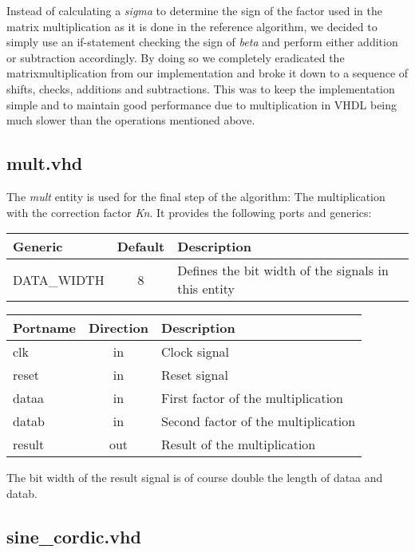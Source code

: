 Instead of calculating a \textit{sigma} to determine the sign of the factor used in the matrix multiplication as it is done in the reference algorithm, we decided to simply use an if-statement checking the sign of \textit{beta} and perform either addition or subtraction accordingly. By doing so we completely eradicated the matrixmultiplication from our implementation and broke it down to a sequence of shifts, checks, additions and subtractions. This was to keep the implementation simple and to maintain good performance due to multiplication in VHDL being much slower than the operations mentioned above.

\subsection{mult.vhd} 

The \textit{mult} entity is used for the final step of the algorithm: The multiplication with the correction factor \textit{Kn}. It provides the following ports and generics:

\begin{center}
	\begin{tabular}{ | l | c | l | }
		\hline
		\textbf{Generic} & \textbf{Default} & \textbf{Description} \\
		\hline
		DATA\_WIDTH & 8 & Defines the bit width of the signals in this entity \\
		\hline
	\end{tabular} 
\end{center}

\begin{center}
	\begin{tabular}{ | l | c | l | }
		\hline
		\textbf{Portname} & \textbf{Direction} & \textbf{Description} \\
		\hline
		clk & in & Clock signal \\
		reset & in  & Reset signal \\
		dataa & in  & First factor of the multiplication \\
		datab & in  & Second factor of the multiplication \\
		result & out  & Result of the multiplication \\
		\hline
	\end{tabular} 
\end{center}

The bit width of the result signal is of course double the length of dataa and datab.

\subsection{sine\_cordic.vhd}

